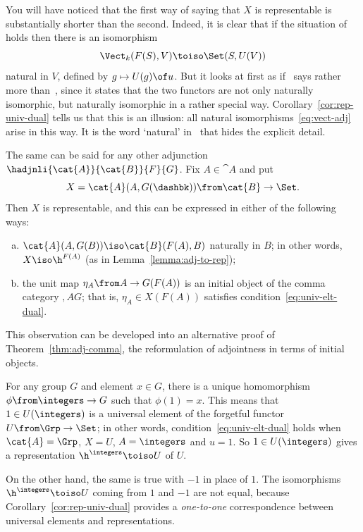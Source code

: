 \begin{example}
You will have noticed that the first way of saying that $X$ is representable
is substantially shorter than the second.  Indeed, it is clear that if the
situation of~ holds then there is an isomorphism
\[
\Vect_k(F(S), V) \toiso \Set(S, U(V))
\]
natural in $V$, defined by $g \mapsto U(g) \of u$.  But it looks at first
as if~ says rather more
than~, since it states that the two functors are
not only naturally isomorphic, but naturally isomorphic in a rather special
way.  Corollary~\ref{cor:rep-univ-dual} tells us that this is an illusion:
all natural isomorphisms~\eqref{eq:vect-adj} arise in this way.  It is the
word `natural'%
%
%
in~ that hides the explicit detail.
\end{example}

\begin{example}
The same can be said for any other adjunction
$\hadjnli{\cat{A}}{\cat{B}}{F}{G}$.  Fix $A \in \cat{A}$ and put
\[
X = \cat{A}(A, G(\dashbk))\from
\cat{B} \to \Set.
\]
Then $X$ is representable, and this can be expressed in either of the
following ways:
% 
\begin{enumerate}[(b)]
\item 
$\cat{A}(A, G(B)) \iso \cat{B}(F(A), B)$ naturally in $B$; in other words,
$X \iso \h^{F(A)}$ (as in Lemma~\ref{lemma:adj-to-rep});

\item 
the unit map $\eta_A\from A \to G(F(A))$ is an initial object of the comma
category $\comma{A}{G}$; that is, $\eta_A \in X(F(A))$ satisfies
condition~\eqref{eq:univ-elt-dual}. 
\end{enumerate}
% 
This observation can be developed into an alternative proof of
Theorem~\ref{thm:adj-comma}, the reformulation of adjointness%
%
%
in terms of initial objects.
\end{example}

\begin{example} 
\label{eg:gp-fgt-rep}
For any group%
%
%
$G$ and element $x \in G$, there is a unique homomorphism $\phi\from
\integers \to G$%
%
%
 such that $\phi(1) = x$.  This means that $1 \in
U(\integers)$ is a universal element of the forgetful functor $U\from \Grp
\to \Set$; in other words, condition~\eqref{eq:univ-elt-dual} holds when
$\cat{A} = \Grp$, $X = U$, $A = \integers$ and $u = 1$.  So $1 \in
U(\integers)$ gives a representation $\h^\integers \toiso U$ of $U$.

On the other hand, the same is true with $-1$ in place of $1$.  The
isomorphisms $\h^\integers \toiso U$ coming from $1$ and $-1$ are not
equal, because Corollary~\ref{cor:rep-univ-dual} provides a \emph{one-to-one}
correspondence between universal elements and representations.
\end{example}
%
%

